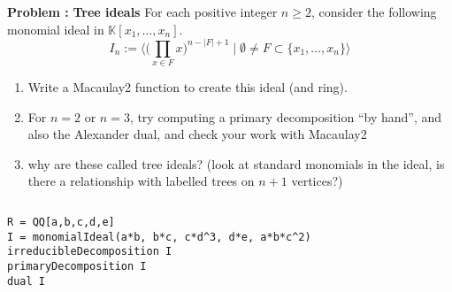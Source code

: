 \documentclass[11pt]{amsart}
\numberwithin{equation}{section}
\newcommand{\bnum}{\begin{enumerate}} %
\newcommand{\babc}{\bnum\renewcommand{\labelenumi}{(\alph{enumi})}}%
\newcommand{\eabc}{\end{enumerate}}
\theoremstyle{definition}
\theoremstyle{remark}
\newcounter{excount}
\newcommand\exercise[1]{\addtocounter{excount}{1}\noindent\textbf{Problem \arabic{excount}: }#1{$ $}\\}
\begin{document}
\exercise{{\bf Tree ideals}
  For each positive integer $n \ge 2$, consider the following monomial ideal in $\mathbb{K}[x_1, \ldots, x_n]$.
  \[I_n := \big\langle \big( \prod_{x \in F} x \big)^{n - |F| + 1} \mid
    \emptyset \ne F \subset \{ x_1, \ldots, x_n \} \big\rangle
    \]
    \babc
  \item Write a Macaulay2 function to create this ideal (and ring).
  \item For $n=2$ or $n=3$, try computing a primary decomposition ``by hand'', and also the Alexander dual,
    and check your work with Macaulay2
  \item why are these called tree ideals?  (look at standard monomials in the ideal, is there a relationship with labelled
    trees on $n+1$ vertices?)
    \eabc
}
{\tiny\begin{verbatim}
R = QQ[a,b,c,d,e]
I = monomialIdeal(a*b, b*c, c*d^3, d*e, a*b*c^2)
irreducibleDecomposition I
primaryDecomposition I
dual I
\end{verbatim}
}
\end{document}
